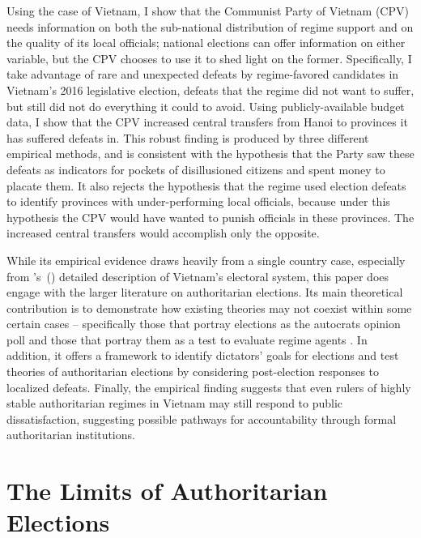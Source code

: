 \documentclass[12pt]{article}
\newcommand\citepos[1]{\citeauthor{#1}'s\ (\citeyear{#1})}
\newcommand{\1}{\mathbbm{1}}
\begin{document}
Using the case of Vietnam, I show that the Communist Party of Vietnam (CPV) needs information on both the sub-national distribution of regime support and on the quality of its local officials; national elections can offer information on either variable, but the CPV chooses to use it to shed light on the former. Specifically, I take advantage of rare and unexpected defeats by regime-favored candidates in Vietnam's 2016 legislative election, defeats that the regime did not want to suffer, but still did not do everything it could to avoid. Using publicly-available budget data, I show that the CPV increased central transfers from Hanoi to provinces it has suffered defeats in. This robust finding is produced by three different empirical methods, and is consistent with the hypothesis that the Party saw these defeats as indicators for pockets of disillusioned citizens and spent money to placate them. It also rejects the hypothesis that the regime used election defeats to identify provinces with under-performing local officials, because under this hypothesis the CPV would have wanted to punish officials in these provinces. The increased central transfers would accomplish only the opposite.

While its empirical evidence draws heavily from a single country case, especially from \citepos{MaleskySchuler2011} detailed description of Vietnam's electoral system, this paper does engage with the larger literature on authoritarian elections. Its main theoretical contribution is to demonstrate how existing theories may not coexist within some certain cases -- specifically those that portray elections as the autocrats opinion poll \citep[e.g.][]{Miller2015, Magaloni2006, Blaydes2008} and those that portray them as a test to evaluate regime agents \citep[e.g.][]{Magaloni2006, Blaydes2008,Myagkov2009,RundlettSvolik2016}. In addition, it offers a framework to identify dictators' goals for elections and test theories of authoritarian elections by considering post-election responses to localized defeats. Finally, the empirical finding suggests that even rulers of highly stable authoritarian regimes in Vietnam may still respond to public dissatisfaction, suggesting possible pathways for accountability through formal authoritarian institutions.

\section{The Limits of Authoritarian Elections}
\label{sec:theory_limits}
\end{document}
